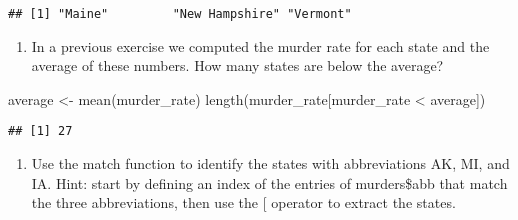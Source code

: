 \documentclass[
]{article}
\newenvironment{Shaded}{\begin{snugshade}}{\end{snugshade}}
\newcommand{\FunctionTok}[1]{\textcolor[rgb]{0.00,0.00,0.00}{#1}}
\newcommand{\NormalTok}[1]{#1}
\newcommand{\OtherTok}[1]{\textcolor[rgb]{0.56,0.35,0.01}{#1}}
\newcommand{\SpecialCharTok}[1]{\textcolor[rgb]{0.00,0.00,0.00}{#1}}
\newcommand{\StringTok}[1]{\textcolor[rgb]{0.31,0.60,0.02}{#1}}
\providecommand{\tightlist}{%
  \setlength{\itemsep}{0pt}\setlength{\parskip}{0pt}}
\begin{document}
\begin{Shaded}
\end{Shaded}

\begin{verbatim}
## [1] "Maine"         "New Hampshire" "Vermont"
\end{verbatim}

\begin{enumerate}
\def\labelenumi{\arabic{enumi}.}
\setcounter{enumi}{4}
\tightlist
\item
  In a previous exercise we computed the murder rate for each state and
  the average of these numbers. How many states are below the average?
\end{enumerate}

\begin{Shaded}
\begin{Highlighting}[]
\NormalTok{average }\OtherTok{\textless{}{-}} \FunctionTok{mean}\NormalTok{(murder\_rate)}
\FunctionTok{length}\NormalTok{(murder\_rate[murder\_rate }\SpecialCharTok{\textless{}}\NormalTok{ average])}
\end{Highlighting}
\end{Shaded}

\begin{verbatim}
## [1] 27
\end{verbatim}

\begin{enumerate}
\def\labelenumi{\arabic{enumi}.}
\setcounter{enumi}{5}
\tightlist
\item
  Use the match function to identify the states with abbreviations AK,
  MI, and IA. Hint: start by defining an index of the entries of
  murders\$abb that match the three abbreviations, then use the {[}
  operator to extract the states.
\end{enumerate}

\begin{Shaded}
\end{Shaded}
\end{document}
